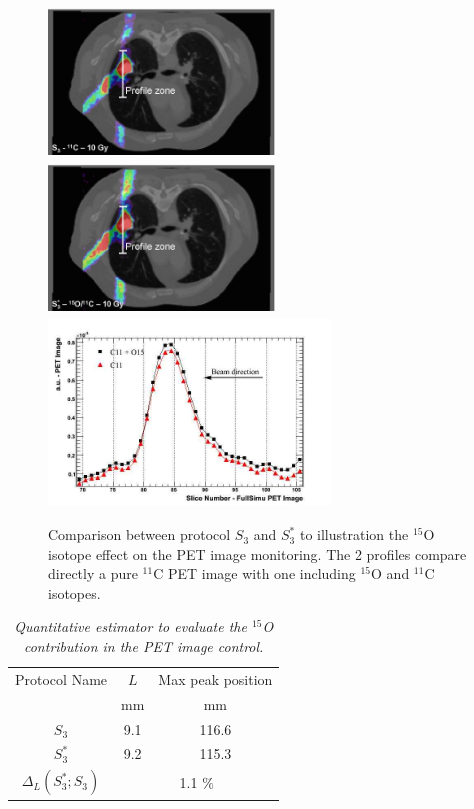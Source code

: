 \documentclass[11pt]{iopart}
\begin{document}
\begin{figure}[!htbp]
  \begin{center}
    \includegraphics[width=6cm,height=40mm]{figures/C11_10Gy_v2.jpg}   
    \includegraphics[width=60mm,height=40mm]{figures/C11_O15_10Gy_v2.jpg}
    \includegraphics[width=75mm,height=50mm]{figures/prof_C11_O15_10Gy_v3.jpg}
    \caption{Comparison between protocol $S_{3}$ and $S_{3}^{*}$ to illustration the $^{15}$O isotope effect on the PET image monitoring. The 2 profiles compare directly a pure $^{11}$C PET image with one including $^{15}$O and $^{11}$C isotopes.}
  \end{center}
  \label{fig:fig4}
\end{figure}

\begin{table}[htbp]
\begin{center}
\begin{tabular}{|c|c|c|} \hline
 Protocol Name                & $L$            & Max peak position       \\
                              &  mm                  & mm                       \\ \hline \hline
$S_{3}$                       & 9.1                  &  116.6                       \\ \hline
$S_{3}^{*}$                   & 9.2                  &  115.3               \\ \hline
$\Delta_{L}(S_{3}^{*};S_{3})$         &        \multicolumn{2}{c|}{1.1 $\%$}     \\ \hline\hline
\end{tabular}
\end{center} 
\caption{\it Quantitative estimator to evaluate the $^{15}$O contribution in the PET image control.}
\label{tab:O15}
\end{table}
\end{document}
